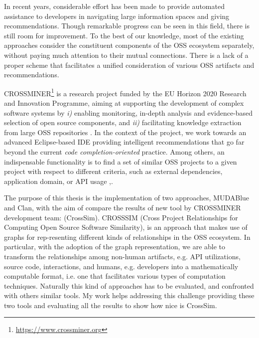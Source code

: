 In recent years, considerable effort has been made to provide automated assistance to developers in navigating large information spaces and giving recommendations. Though remarkable progress can be seen in this field, there is still room for improvement. To the best of our knowledge, most of the existing approaches consider the constituent components of the OSS ecosystem separately, without paying much attention to their mutual connections. There is a lack of a proper scheme that facilitates a unified consideration of various OSS artifacts and recommendations. 

CROSSMINER\footnote{\url{https://www.crossminer.org}} is a research project funded by the EU Horizon 2020 Research and Innovation Programme, aiming at supporting the development of complex software systems by \textit{i)} enabling monitoring, in-depth analysis and evidence-based selection of open source components, and \textit{ii)} facilitating knowledge extraction from large OSS repositories \cite{10.1007/978-3-319-74730-9_33}. In the context of the project, we work towards an advanced Eclipse-based IDE providing intelligent recommendations that go far beyond the current \emph{code completion-oriented} practice. Among others, an indispensable functionality is to find a set of similar OSS projects to a given project with respect to different criteria, such as external dependencies, application domain, or API usage \cite{NDRDSEAA2018},\cite{DBLP:conf/iir/NDD013}.

The purpose of this thesis is the implementation of two approaches, MUDABlue and Clan, with the aim of compare the results of new tool by CROSSMINER development team: (CrossSim). CROSSSIM (Cross Project Relationships for Computing Open Source Software Similarity), is an approach that makes use of graphs for rep-resenting different kinds of relationships in the OSS ecosystem. In particular, with the adoption of the graph representation, we are able to transform the relationships among non-human artifacts, e.g. API utilizations, source code, interactions, and humans, e.g. developers into a mathematically computable format, i.e. one that
facilitates various types of computation techniques. Naturally this kind of approaches has to be evaluated, and confronted with others similar tools. My work helps addressing this challenge providing these two tools and evaluating all the results to show how nice is CrossSim.